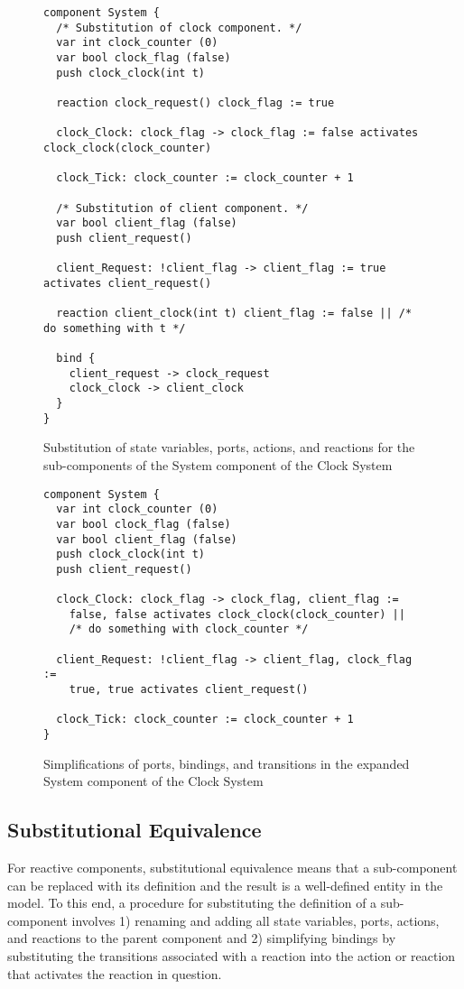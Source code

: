\begin{figure}
\begin{verbatim}
component System {
  /* Substitution of clock component. */
  var int clock_counter (0)
  var bool clock_flag (false)
  push clock_clock(int t)

  reaction clock_request() clock_flag := true

  clock_Clock: clock_flag -> clock_flag := false activates clock_clock(clock_counter)

  clock_Tick: clock_counter := clock_counter + 1

  /* Substitution of client component. */
  var bool client_flag (false)
  push client_request()

  client_Request: !client_flag -> client_flag := true activates client_request()

  reaction client_clock(int t) client_flag := false || /* do something with t */

  bind {
    client_request -> clock_request
    clock_clock -> client_clock
  }
}
\end{verbatim}
\caption[Substitution of sub-components for the Clock System]{Substitution of state variables, ports, actions, and reactions for the sub-components of the System component of the Clock System}
\label{se1}
\end{figure}

\begin{figure}
\begin{verbatim}
component System {
  var int clock_counter (0)
  var bool clock_flag (false)
  var bool client_flag (false)
  push clock_clock(int t)
  push client_request()

  clock_Clock: clock_flag -> clock_flag, client_flag :=
    false, false activates clock_clock(clock_counter) ||
    /* do something with clock_counter */

  client_Request: !client_flag -> client_flag, clock_flag :=
    true, true activates client_request()

  clock_Tick: clock_counter := clock_counter + 1
}
\end{verbatim}
\caption[Simplification of expanded System component of the Clock System]{Simplifications of ports, bindings, and transitions in the expanded System component of the Clock System}
\label{se2}
\end{figure}

\subsection{Substitutional Equivalence}
\label{substitutional_equivalence}
For reactive components, substitutional equivalence means that a sub-component can be replaced with its definition and the result is a well-defined entity in the model.
To this end, a procedure for substituting the definition of a sub-component involves 1) renaming and adding all state variables, ports, actions, and reactions to the parent component and 2) simplifying bindings by substituting the transitions associated with a reaction into the action or reaction that activates the reaction in question.

